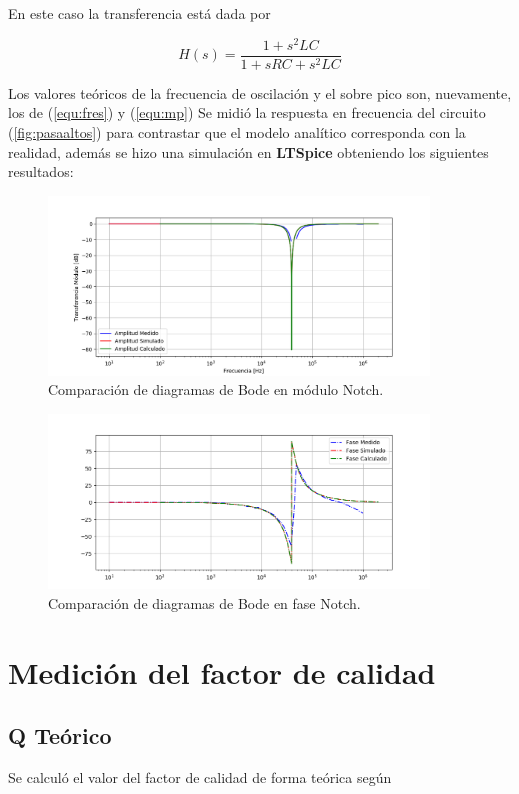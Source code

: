 En este caso la transferencia está dada por 

\begin{equation}
    H(s)=\frac{1+s^ {2}LC}{1+sRC+s^ {2}LC}
\label{eq:BandReject}
\end{equation}

Los valores teóricos de la frecuencia de oscilación y el sobre pico son, nuevamente, los de (\ref{equ:fres}) y (\ref{equ:mp})
Se midió la respuesta en frecuencia del circuito (\ref{fig:pasaaltos}) para contrastar que el modelo analítico corresponda con la realidad, además se hizo una simulación en \textbf{LTSpice} obteniendo los siguientes resultados:
\begin{figure}[H]
	\centering
	\includegraphics[width=0.9\textwidth]{Bodes_Labo/Fotos/BR.png}
\caption{Comparación de diagramas de Bode en módulo Notch.}
	\label{fig:BODEBR}
\end{figure}

\begin{figure}[H]
	\centering
	\includegraphics[width=0.9\textwidth]{Bodes_Labo/Fotos/BRP.png}
\caption{Comparación de diagramas de Bode en fase Notch.}
	\label{fig:BODEBRP}
\end{figure}
\section{Medición del factor de calidad}
\subsection{Q Teórico}
Se calculó el valor del factor de calidad de forma teórica según 

